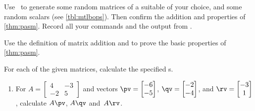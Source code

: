 \begin{exercise}  
Use \script\ to generate some random matrices of a suitable  of your choice, and some random scalars (see \autoref{tbl:mtlbops}).
Then confirm the addition and  properties of \autoref{thm:pasm}.
Record all your commands and the output from \script.
\end{exercise}


\begin{exercise}  
Use the definition of matrix addition and  to prove the basic properties of \autoref{thm:pasm}. 
\end{exercise}







\begin{exercise} \label{ex:matvc} 
For each of the given matrices, calculate the specified s.
\begin{enumerate}
\item For \(A=\begin{bmatrix} 4&-3
\\-2&5 \end{bmatrix}\) and vectors 
\(\pv=\begin{bmatrix} -6\\-5 \end{bmatrix}\), 
\(\qv=\begin{bmatrix} -2\\-4 \end{bmatrix}\), and
\(\rv=\begin{bmatrix} -3\\1 \end{bmatrix}\), 
calculate  \(A\pv\), \(A\qv\) and~\(A\rv\).



\end{enumerate}
\end{exercise}
